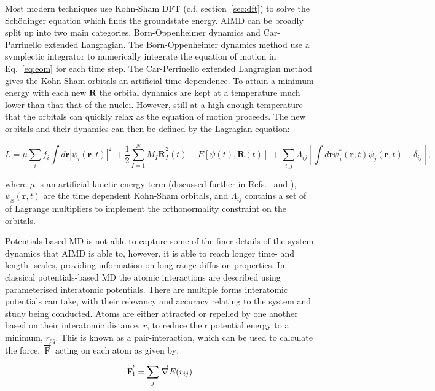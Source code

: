 \documentclass[../main.tex]{subfiles}
\begin{document}
Most modern techniques use Kohn-Sham DFT (c.f. section~\ref{sec:dft}) to solve the Sch\"{o}dinger equation which finds the groundstate energy. AIMD can be broadly split up into two main categories, Born-Oppenheimer dynamics and Car-Parrinello extended Langragian. The Born-Oppenheimer dynamics method use a symplectic integrator to numerically integrate the equation of motion in Eq.~\ref{eq:eom} for each time step. The Car-Perrinello extended Langragian method gives the Kohn-Sham orbitals an artificial time-dependence. To attain a minimum energy with each new $\textbf{R}$ the orbital dynamics are kept at a temperature much lower than that that of the nuclei. However, still at a high enough temperature that the orbitals can quickly relax as the equation of motion proceeds. The new orbitals and their dynamics can then be defined by the Lagragian equation:\cite{Car1985}

\begin{equation}
    L=\mu \sum_i f_i \int d\textbf{r}|\psi_i(\textbf{r},t)|^2 \
    +\frac{1}{2}\sum^N_{I=1} M_I\dot{\textbf{R}}^2_I (t)- E\left[{\psi(t)}, \textbf{R}(t)\right] \
    +\sum_{i,j} \Lambda_{ij}\left[\int d\textbf{r}\psi^*_{\,i}(\textbf{r},t)\psi_j(\textbf{r}, t)- \delta_{ij}\right],
\end{equation}

where $\mu$ is an artificial kinetic energy term (discussed further in Refs.~ and ), $\psi_x(\textbf{r},t)$ are the time dependent Kohn-Sham orbitals, and $\Lambda_{ij}$ contains a set of of Lagrange multipliers to implement the orthonormality constraint on the orbitals. 

Potentials-based MD is not able to capture some of the finer details of the system dynamics that AIMD is able to, however, it is able to reach longer time- and length- scales, providing information on long range diffusion properties. In classical potentials-based MD the atomic interactions are described using parameterised interatomic potentials. There are multiple forms interatomic potentials can take, with their relevancy and accuracy relating to the system and study being conducted. Atoms are either attracted or repelled by one another based on their interatomic distance, $r$, to reduce their potential energy to a minimum, $r_{eq}$. This is known as a pair-interaction, which can be used to calculate the force, $\overrightarrow{\rm F}$ acting on each atom as given by:

\begin{equation}
    \overrightarrow{\rm F_i} = \sum_j {\overrightarrow{\nabla}}E(r_{ij})
\end{equation}
\end{document}
